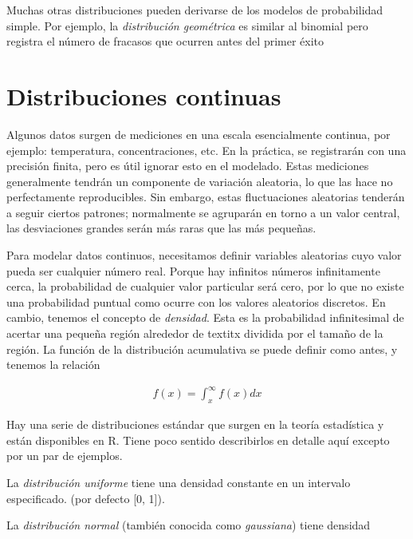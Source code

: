 Muchas otras distribuciones pueden derivarse de los modelos de probabilidad
simple. Por ejemplo, la \textit{distribución geométrica} es similar al binomial
pero registra el número de fracasos que ocurren antes del primer éxito

\section{Distribuciones continuas}

Algunos datos surgen de mediciones en una escala esencialmente continua, por
ejemplo: temperatura, concentraciones, etc. En la práctica, se
registrarán con una precisión finita, pero es útil ignorar esto en el modelado.
Estas mediciones generalmente tendrán un componente de variación aleatoria, lo
que las hace no perfectamente reproducibles. Sin embargo, estas
fluctuaciones aleatorias tenderán a seguir ciertos patrones; normalmente se agruparán en
torno a un valor central, las desviaciones grandes serán más raras que las más
pequeñas.


Para modelar datos continuos, necesitamos definir variables aleatorias cuyo
valor pueda ser cualquier número real. Porque hay infinitos números
infinitamente cerca, la probabilidad de cualquier valor particular será cero,
por lo que no existe una probabilidad puntual como ocurre con los valores
aleatorios discretos. En cambio, tenemos el concepto de \textit{densidad}. Esta
es la probabilidad infinitesimal de acertar una pequeña región alrededor de
textit{x} dividida por el tamaño de la región. La función de la distribución acumulativa
se puede definir como antes, y tenemos la relación

\begingroup
\Large
\begin{gather*}
     f(x) =\int_{x}^{\infty}f(x)dx
\end{gather*}
\endgroup

Hay una serie de distribuciones estándar que surgen en la teoría estadística y
están disponibles en R. Tiene poco sentido describirlos en detalle  aquí excepto
por un par de ejemplos.

La \textit{distribución uniforme} tiene una densidad constante en un intervalo
especificado. (por defecto [0, 1]).

La \textit{distribución normal}  (también conocida como \textit{gaussiana}) tiene
densidad

